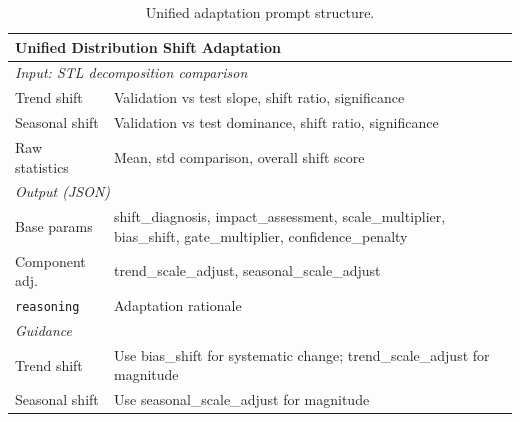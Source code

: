 \begin{table}[h!]
\centering
\scriptsize
\setlength{\tabcolsep}{3pt}
\begin{tabular}{p{2.2cm}p{4.8cm}}
\toprule
\multicolumn{2}{l}{\textbf{Unified Distribution Shift Adaptation}} \\
\midrule
\multicolumn{2}{l}{\textit{Input: STL decomposition comparison}} \\
Trend shift & Validation vs test slope, shift ratio, significance \\
Seasonal shift & Validation vs test dominance, shift ratio, significance \\
Raw statistics & Mean, std comparison, overall shift score \\
\midrule
\multicolumn{2}{l}{\textit{Output (JSON)}} \\
Base params & shift\_diagnosis, impact\_assessment, scale\_multiplier, bias\_shift, gate\_multiplier, confidence\_penalty \\
Component adj. & trend\_scale\_adjust, seasonal\_scale\_adjust \\
\texttt{reasoning} & Adaptation rationale \\
\midrule
\multicolumn{2}{l}{\textit{Guidance}} \\
Trend shift & Use bias\_shift for systematic change; trend\_scale\_adjust for magnitude \\
Seasonal shift & Use seasonal\_scale\_adjust for magnitude \\
\bottomrule
\end{tabular}
\caption{Unified adaptation prompt structure.}
\label{tab:prompt_adapt_unified}
\end{table}
